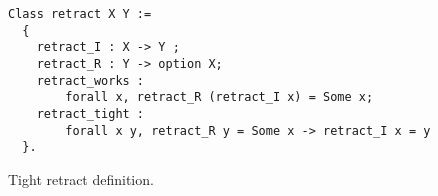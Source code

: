 \documentclass[sigplan,nonacm,review]{acmart}
\begin{document}
\begin{figure}[H]
\begin{lstlisting}[language=Coq]
Class retract X Y :=
  {
    retract_I : X -> Y ;
    retract_R : Y -> option X;
    retract_works : 
        forall x, retract_R (retract_I x) = Some x;
    retract_tight : 
        forall x y, retract_R y = Some x -> retract_I x = y
  }.
\end{lstlisting}
\caption{Tight retract definition.}
  \label{appendix:tight_retract}
\end{figure}
\end{document}

